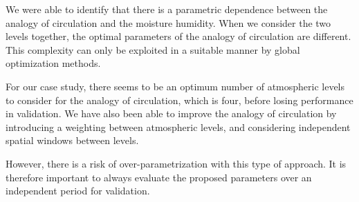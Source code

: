\documentclass[twocol]{ametsoc}
\begin{document}
We were able to identify that there is a parametric dependence between the analogy of circulation and the moisture humidity. When we consider the two levels together, the optimal parameters of the analogy of circulation are different. This complexity can only be exploited in a suitable manner by global optimization methods.

For our case study, there seems to be an optimum number of atmospheric levels to consider for the analogy of circulation, which is four, before losing performance in validation. We have also been able to improve the analogy of circulation by introducing a weighting between atmospheric levels, and considering independent spatial windows between levels.

However, there is a risk of over-parametrization with this type of approach. It is therefore important to always evaluate the proposed parameters over an independent period for validation. 



\end{document}
